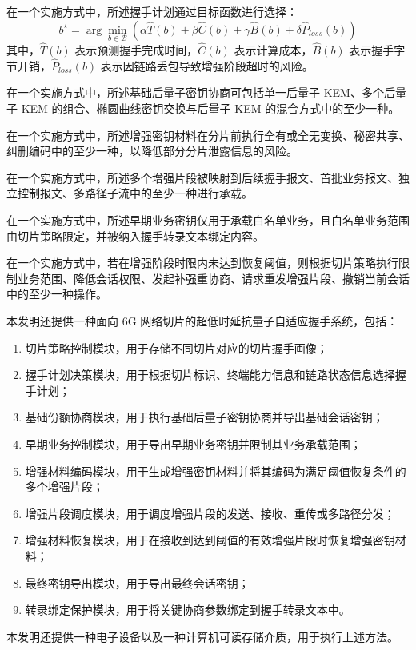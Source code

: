 \documentclass[12pt,a4paper]{article}
\begin{document}
在一个实施方式中，所述握手计划通过目标函数进行选择：
\[
b^\star=\arg\min_{b \in \mathcal{B}} \left(\alpha \hat{T}(b)+\beta \hat{C}(b)+\gamma \hat{B}(b)+\delta \hat{P}_{loss}(b)\right)
\]
其中，$\hat{T}(b)$ 表示预测握手完成时间，$\hat{C}(b)$ 表示计算成本，$\hat{B}(b)$ 表示握手字节开销，$\hat{P}_{loss}(b)$ 表示因链路丢包导致增强阶段超时的风险。

在一个实施方式中，所述基础后量子密钥协商可包括单一后量子 KEM、多个后量子 KEM 的组合、椭圆曲线密钥交换与后量子 KEM 的混合方式中的至少一种。

在一个实施方式中，所述增强密钥材料在分片前执行全有或全无变换、秘密共享、纠删编码中的至少一种，以降低部分分片泄露信息的风险。

在一个实施方式中，所述多个增强片段被映射到后续握手报文、首批业务报文、独立控制报文、多路径子流中的至少一种进行承载。

在一个实施方式中，所述早期业务密钥仅用于承载白名单业务，且白名单业务范围由切片策略限定，并被纳入握手转录文本绑定内容。

在一个实施方式中，若在增强阶段时限内未达到恢复阈值，则根据切片策略执行限制业务范围、降低会话权限、发起补强重协商、请求重发增强片段、撤销当前会话中的至少一种操作。

本发明还提供一种面向 6G 网络切片的超低时延抗量子自适应握手系统，包括：

\begin{enumerate}[label=\arabic*), leftmargin=2em]
    \item 切片策略控制模块，用于存储不同切片对应的切片握手画像；
    \item 握手计划决策模块，用于根据切片标识、终端能力信息和链路状态信息选择握手计划；
    \item 基础份额协商模块，用于执行基础后量子密钥协商并导出基础会话密钥；
    \item 早期业务控制模块，用于导出早期业务密钥并限制其业务承载范围；
    \item 增强材料编码模块，用于生成增强密钥材料并将其编码为满足阈值恢复条件的多个增强片段；
    \item 增强片段调度模块，用于调度增强片段的发送、接收、重传或多路径分发；
    \item 增强材料恢复模块，用于在接收到达到阈值的有效增强片段时恢复增强密钥材料；
    \item 最终密钥导出模块，用于导出最终会话密钥；
    \item 转录绑定保护模块，用于将关键协商参数绑定到握手转录文本中。
\end{enumerate}

本发明还提供一种电子设备以及一种计算机可读存储介质，用于执行上述方法。
\end{document}
